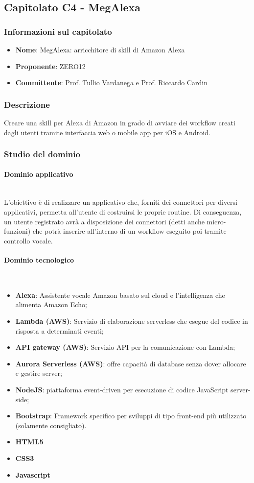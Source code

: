 \subsection{Capitolato C4 - MegAlexa}
\subsubsection{Informazioni sul capitolato}
\begin{itemize}
    \item \textbf{Nome}: MegAlexa: arricchitore di skill di Amazon Alexa
	\item \textbf{Proponente}: ZERO12
	\item \textbf{Committente}: Prof. Tullio Vardanega e Prof. Riccardo Cardin
\end{itemize}
\subsubsection{Descrizione}
Creare una skill per Alexa di Amazon in grado di avviare dei workflow creati dagli utenti tramite interfaccia web o mobile app per iOS e Android.
\subsubsection{Studio del dominio}
\paragraph{Dominio applicativo}\mbox{}\\
L'obiettivo è di realizzare un applicativo che, forniti dei connettori per diversi applicativi, permetta all’utente di costruirsi le proprie routine. Di conseguenza, un utente registrato avrà a disposizione dei connettori (detti anche micro-funzioni) che potrà inserire all’interno di un workflow eseguito poi tramite controllo vocale.
\paragraph{Dominio tecnologico}\mbox{}\\
\begin{itemize}
    \item \textbf{Alexa}: Assistente vocale Amazon basato sul cloud e l'intelligenza che alimenta Amazon Echo;
    \item \textbf{Lambda (AWS)}: Servizio di elaborazione serverless che esegue del codice in risposta a determinati eventi;
    \item \textbf{API gateway (AWS)}: Servizio API per la comunicazione con Lambda;
    \item \textbf{Aurora Serverless (AWS)}: offre capacità di database senza dover allocare e gestire server;
    \item \textbf{NodeJS}: piattaforma event-driven per esecuzione di codice JavaScript server-side;
    \item \textbf{Bootstrap}: Framework specifico per sviluppi di tipo front-end più utilizzato (solamente consigliato).
    \item \textbf{HTML5}
    \item \textbf{CSS3}
    \item \textbf{Javascript}
\end{itemize}
